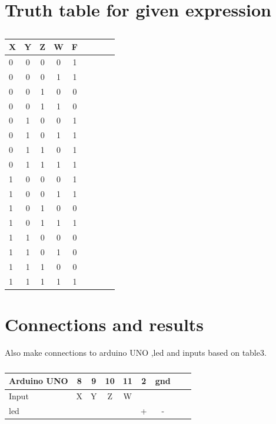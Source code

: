\documentclass[10pt, a4paper]{article}
\begin{document}
\section{Truth table for given expression}
\begin{table}[htbp]
 \begin{center}
    \begin{tabular}{|l|c|c|c|c|c|c|c|c} \hline \textbf{X}
  & \textbf{Y} & \textbf{Z} & \textbf{W}& \textbf{F} \\
 \hline
        0&0&0&0&1 \\
        \hline
        0&0&0&1&1 \\
        \hline
        0&0&1&0&0 \\
        \hline
        0&0&1&1&0 \\
        \hline
        0&1&0&0&1 \\
        \hline
        0&1&0&1&1 \\
        \hline
        0&1&1&0&1 \\
        \hline
        0&1&1&1&1 \\
        \hline
        1&0&0&0&1 \\
        \hline
        1&0&0&1&1 \\
        \hline
        1&0&1&0&0 \\
        \hline
        1&0&1&1&1 \\
        \hline
        1&1&0&0&0 \\
        \hline
        1&1&0&1&0 \\
        \hline
        1&1&1&0&0 \\
        \hline
        1&1&1&1&1 \\
        \hline
\end{tabular}   
\end{center}
\caption{\label{table:dummytable} }
\end{table}

\section{Connections and results}



Also make connections to arduino UNO ,led and inputs based on table3. 

\begin{table}[htbp]
 \begin{center}
    \begin{tabular}{|l|c|c|c|c|c|c|c|c} \hline \textbf{Arduino UNO}
  & \textbf{8} & \textbf{9} & \textbf{10}& \textbf{11}& \textbf{2}& \textbf{gnd} \\
 \hline
Input&X&Y&Z&W&&\\ \hline
led&&&&&+&- \\ \hline
\end{tabular}   
\end{center}
\caption{\label{table:dummytable} }
\end{table}
\end{document}
